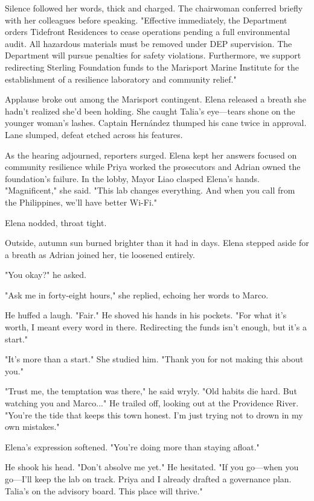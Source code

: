 Silence followed her words, thick and charged. The chairwoman conferred briefly with her colleagues before speaking. "Effective immediately, the Department orders Tidefront Residences to cease operations pending a full environmental audit. All hazardous materials must be removed under DEP supervision. The Department will pursue penalties for safety violations. Furthermore, we support redirecting Sterling Foundation funds to the Marisport Marine Institute for the establishment of a resilience laboratory and community relief."

Applause broke out among the Marisport contingent. Elena released a breath she hadn't realized she'd been holding. She caught Talia's eye—tears shone on the younger woman's lashes. Captain Hernández thumped his cane twice in approval. Lane slumped, defeat etched across his features.

As the hearing adjourned, reporters surged. Elena kept her answers focused on community resilience while Priya worked the prosecutors and Adrian owned the foundation's failure. In the lobby, Mayor Liao clasped Elena's hands. "Magnificent," she said. "This lab changes everything. And when you call from the Philippines, we'll have better Wi-Fi."

Elena nodded, throat tight.

Outside, autumn sun burned brighter than it had in days. Elena stepped aside for a breath as Adrian joined her, tie loosened entirely.

"You okay?" he asked.

"Ask me in forty-eight hours," she replied, echoing her words to Marco.

He huffed a laugh. "Fair." He shoved his hands in his pockets. "For what it's worth, I meant every word in there. Redirecting the funds isn't enough, but it's a start."

"It's more than a start." She studied him. "Thank you for not making this about you."

"Trust me, the temptation was there," he said wryly. "Old habits die hard. But watching you and Marco..." He trailed off, looking out at the Providence River. "You're the tide that keeps this town honest. I'm just trying not to drown in my own mistakes."

Elena's expression softened. "You're doing more than staying afloat."

He shook his head. "Don't absolve me yet." He hesitated. "If you go—when you go—I'll keep the lab on track. Priya and I already drafted a governance plan. Talia's on the advisory board. This place will thrive."

